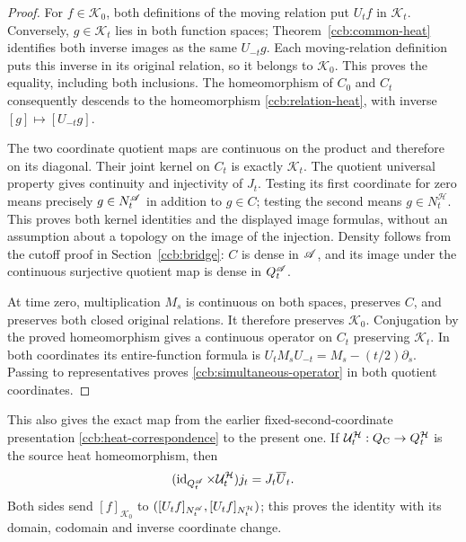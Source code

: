 \begin{proof}
For $f\in \mathscr K_0$, both definitions of the moving relation put $U_tf$
in $\mathscr K_t$. Conversely, $g\in \mathscr K_t$ lies in both function spaces;
Theorem~\ref{ccb:common-heat} identifies both inverse images as the
same $U_{-t}g$. Each moving-relation definition puts this inverse
in its original relation, so it belongs to $\mathscr K_0$. This proves the
equality, including both inclusions. The homeomorphism of $C_0$
and $C_t$ consequently descends to the homeomorphism
\eqref{ccb:relation-heat}, with inverse $[g]\mapsto[U_{-t}g]$.

The two coordinate quotient maps are continuous on the product
and therefore on its diagonal. Their joint kernel on $C_t$ is
exactly $\mathscr K_t$. The quotient universal property gives continuity
and injectivity of $J_t$. Testing its first coordinate for zero
means precisely $g\in N_t^{\mathscr A}$ in addition to $g\in C$; testing
the second means $g\in N_t^{\mathcal H}$. This proves both kernel
identities and the displayed image formulas, without an assumption
about a topology on the image of the injection. Density follows
from the cutoff proof in Section~\ref{ccb:bridge}: $C$ is dense in
$\mathscr A$, and its image under the continuous surjective quotient map
is dense in $Q_t^{\mathscr A}$.

At time zero, multiplication $M_s$ is continuous on both spaces,
preserves $C$, and preserves both closed original relations.
It therefore preserves $\mathscr K_0$. Conjugation by the proved
homeomorphism gives a continuous operator on $C_t$ preserving
$\mathscr K_t$. In both coordinates its entire-function formula is
$U_tM_sU_{-t}=M_s-(t/2)\partial_s$. Passing to representatives
proves \eqref{ccb:simultaneous-operator} in both quotient coordinates.
\end{proof}

This also gives the exact map from the earlier fixed-second-coordinate
presentation \eqref{ccb:heat-correspondence} to the present one. If
$\mathcal U_t^{\mathcal H}:Q_{\rm C}\to Q_t^{\mathcal H}$ is the
source heat homeomorphism, then
\begin{equation}
 (\operatorname{id}_{Q_t^{\mathscr A}}\times\mathcal U_t^{\mathcal H})
                 j_t=J_t\overline U_t.
 \label{ccb:old-new-correspondence}
\end{equation}
Both sides send $[f]_{\mathscr K_0}$ to
$([U_tf]_{N_t^{\mathscr A}},[U_tf]_{N_t^{\mathcal H}})$; this proves the
identity with its domain, codomain and inverse coordinate change.


